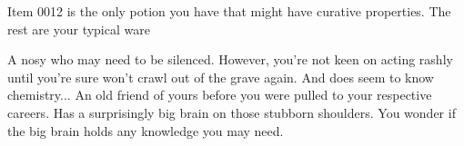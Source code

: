 \documentclass[char]{guildcamp4}
\begin{document}
\begin{itemz}[Notes]
	\item Item 0012 is the only potion you have that might have curative properties. The rest are your typical ware
\end{itemz}

\begin{contacts}
	\contact{\cOutsider{}} A nosy \cOutsider{\human} who may need to be silenced. However, you're not keen on acting rashly until you're sure \cOutsider{\they} won't crawl out of the grave again. And \cOutsider{\they} does seem to know \cOutsider{\their} chemistry...
	\contact{\cApprentice{}} An old friend of yours before you were pulled to your respective careers. Has a surprisingly big brain on those stubborn shoulders. You wonder if the big brain holds any knowledge you may need.
\end{contacts}
\end{document}
